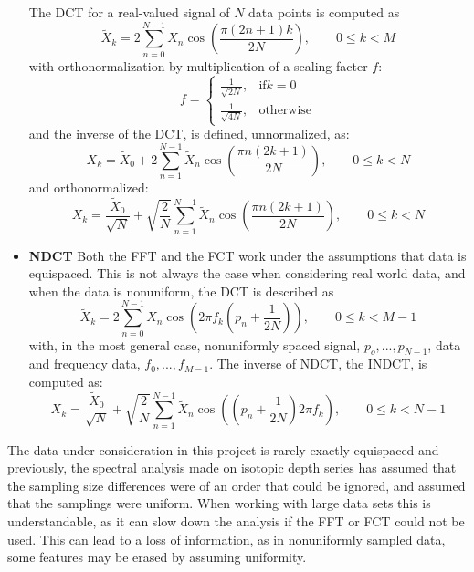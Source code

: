 \documentclass[../../CompleteThesis2/Complete_2ndDraft]{subfiles}
\begin{document}
\begin{itemize}
	The DCT for a real-valued signal of $N$ data points is computed as
	\begin{equation}
		\tilde{X}_k = 2\sum_{n=0}^{N-1} X_n \cos\left(\frac{\pi(2n+1)k}{2N}\right), \qquad 0\leq k<M
	\end{equation}  
	with orthonormalization by multiplication of a scaling facter $f$:
	\begin{equation}
		f = \begin{cases}
			\frac{1}{\sqrt{2N}}, & \text{if} k = 0 \\
			\frac{1}{\sqrt{4N}}, & \text{otherwise}
		\end{cases}
	\end{equation}
	and the inverse of the DCT, is defined, unnormalized, as: 
	\begin{equation}
		X_k = \tilde{X}_0 + 2\sum_{n=1}^{N-1} \tilde{X}_n\cos\left(\frac{\pi n(2k+1)}{2N}\right), \qquad 0 \leq k < N 
		\label{Eq:IDCT}
	\end{equation}
	and orthonormalized:
	\begin{equation}
		X_k = \frac{\tilde{X}_0}{\sqrt{N}} + \sqrt{\frac{2}{N}}\sum_{n=1}^{N-1} \tilde{X}_n\cos\left(\frac{\pi n(2k+1)}{2N}\right), \qquad 0 \leq k < N 
		\label{Eq:IDCT_ortho}
	\end{equation}
	
	
	\item \textbf{NDCT} Both the FFT and the FCT work under the assumptions that data is equispaced. This is not always the case when considering real world data, and when the data is nonuniform, the DCT is described as 
	\begin{equation}
		\tilde{X}_k = 2\sum_{n=0}^{N-1}X_n \cos\left(2\pi f_k\left(p_n + \frac{1}{2N}\right)\right), \qquad 0 \leq k < M-1
		\label{Eq:NDCT}
	\end{equation}
	with, in the most general case, nonuniformly spaced signal, $p_o,...,p_{N-1}$, data and frequency data, $f_0,...,f_{M-1}$.
	The inverse of NDCT, the INDCT, is computed as:
	\begin{equation}
		X_k = \frac{\tilde{X}_0}{\sqrt{N}} + \sqrt{\frac{2}{N}}\sum_{n=1}^{N-1} \tilde{X}_n \cos\left(\left(p_n + \frac{1}{2N}\right)2\pi f_k\right), \qquad 0 \leq k < N -1
		\label{Eq:INDCT}
	\end{equation}
\end{itemize}

The data under consideration in this project is rarely exactly equispaced and previously, the spectral analysis made on isotopic depth series has assumed that the sampling size differences were of an order that could be ignored, and assumed that the samplings were uniform.  When working with large data sets this is understandable, as it can slow down the analysis if the FFT or FCT could not be used. This can lead to a loss of information, as in nonuniformly sampled data, some features may be erased by assuming uniformity. 
\end{document}
